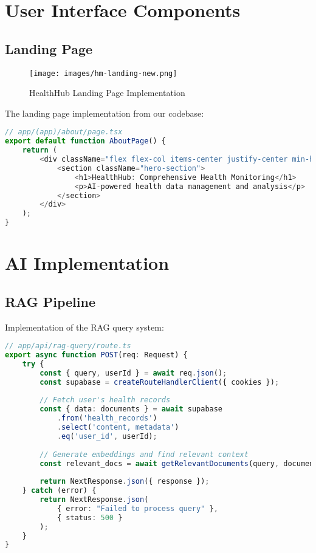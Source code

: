 \section{User Interface Components}
\subsection{Landing Page}
\begin{figure}[H]
    \centering
    \texttt{[image: images/hm-landing-new.png]}
    \caption{HealthHub Landing Page Implementation}
\end{figure}

The landing page implementation from our codebase:
\begin{lstlisting}[language=TypeScript, caption=Landing Page Implementation]
// app/(app)/about/page.tsx
export default function AboutPage() {
    return (
        <div className="flex flex-col items-center justify-center min-h-screen">
            <section className="hero-section">
                <h1>HealthHub: Comprehensive Health Monitoring</h1>
                <p>AI-powered health data management and analysis</p>
            </section>
        </div>
    );
}
\end{lstlisting}

\section{AI Implementation}
\subsection{RAG Pipeline}
Implementation of the RAG query system:
\begin{lstlisting}[language=TypeScript, caption=RAG Query Implementation]
// app/api/rag-query/route.ts
export async function POST(req: Request) {
    try {
        const { query, userId } = await req.json();
        const supabase = createRouteHandlerClient({ cookies });
        
        // Fetch user's health records
        const { data: documents } = await supabase
            .from('health_records')
            .select('content, metadata')
            .eq('user_id', userId);
            
        // Generate embeddings and find relevant context
        const relevant_docs = await getRelevantDocuments(query, documents);
        
        return NextResponse.json({ response });
    } catch (error) {
        return NextResponse.json(
            { error: "Failed to process query" },
            { status: 500 }
        );
    }
}
\end{lstlisting}

